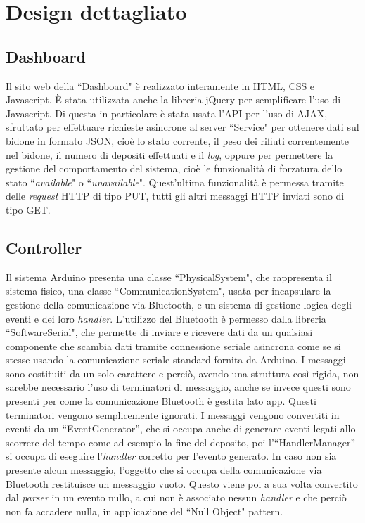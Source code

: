 \documentclass[a4paper, 12pt]{report}
\begin{document}
		\section{Design dettagliato}
			\subsection{Dashboard}
			Il sito web della ``Dashboard" è realizzato interamente in HTML, CSS e Javascript. È stata
			utilizzata anche la libreria jQuery per semplificare l'uso di Javascript. Di questa in
			particolare è stata usata l'API per l'uso di AJAX, sfruttato per effettuare richieste
			asincrone al server ``Service" per ottenere dati sul bidone in formato JSON, cioè lo stato corrente,
			il peso dei rifiuti correntemente nel bidone, il numero di depositi effettuati e il \textit{log},
			oppure per permettere la gestione del comportamento del sistema, cioè le
			funzionalità di forzatura dello stato ``\textit{available}" o ``\textit{unavailable}".
			Quest'ultima funzionalità è permessa tramite delle \textit{request} HTTP di tipo PUT, tutti
			gli altri messaggi HTTP inviati sono di tipo GET.
			\subsection{Controller}
			Il sistema Arduino presenta una classe ``PhysicalSystem", che rappresenta il sistema fisico, 
			una classe ``CommunicationSystem", usata per incapsulare la gestione della comunicazione via Bluetooth, 
			e un sistema di gestione logica degli eventi e dei loro \textit{handler}.\newline
			L'utilizzo del Bluetooth è permesso dalla libreria ``SoftwareSerial", che permette di inviare
			e ricevere dati da un qualsiasi componente che scambia dati tramite connessione seriale
			asincrona come se si stesse usando la comunicazione seriale standard fornita da Arduino.\newline 
			I messaggi sono costituiti da un solo carattere e perciò, avendo una struttura così
			rigida, non sarebbe necessario l'uso di terminatori di messaggio, anche se invece questi sono
			presenti per come la comunicazione Bluetooth è gestita lato app. Questi terminatori vengono semplicemente ignorati. I messaggi vengono convertiti in 
			eventi da un ``EventGenerator'', che si occupa anche di generare eventi legati allo scorrere 
			del tempo come ad esempio la fine del deposito, poi l'``HandlerManager'' si occupa di eseguire l'\textit{handler} corretto per l'evento generato.\newline
			In caso non sia presente alcun messaggio, l'oggetto che si occupa della comunicazione via
			Bluetooth restituisce un messaggio vuoto. Questo viene poi a sua volta convertito dal
			\textit{parser} in un evento nullo, a cui non è associato nessun \textit{handler} e che
			perciò non fa accadere nulla, in applicazione del ``Null Object" pattern.
\end{document}
